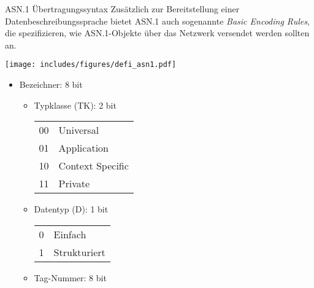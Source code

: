 \begin{defi}{ASN.1 Übertragungssyntax}
    Zusätzlich zur Bereitstellung einer Datenbeschreibungssprache bietet ASN.1 auch sogenannte \emph{Basic Encoding Rules}, die spezifizieren, wie ASN.1-Objekte über das Netzwerk versendet werden sollten an.
    
    \begin{center}
        \texttt{[image: includes/figures/defi\_asn1.pdf]}
    \end{center}
    
    \begin{itemize}
        \item Bezeichner: 8 bit
              
              \begin{itemize}
                  \item Typklasse (TK): 2 bit
                        
                        \begin{tabular}{T|l}
                            00 & Universal        \\
                            01 & Application      \\
                            10 & Context Specific \\
                            11 & Private
                        \end{tabular}
                  \item Datentyp (D): 1 bit
                        
                        \begin{tabular}{T|l}
                            0 & Einfach      \\
                            1 & Strukturiert
                        \end{tabular}
                  \item Tag-Nummer: 8 bit
                        

\end{itemize}
\end{itemize}
\end{defi}
